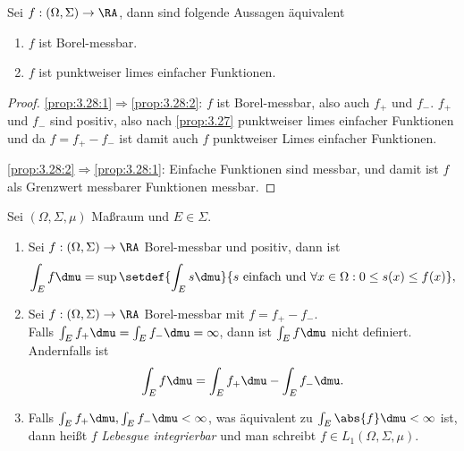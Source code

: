 \begin{cor}
\label{prop:3.28}
Sei $f: (\Omega,\Sigma)\to\RA$, dann sind folgende Aussagen äquivalent
\begin{enumerate}[label=(\roman{*})]
  \item\label{prop:3.28:1} $f$ ist Borel-messbar.
  \item\label{prop:3.28:2} $f$ ist punktweiser limes einfacher
  Funktionen.\fishhere
\end{enumerate}
\end{cor}
\begin{proof}
\ref{prop:3.28:1}$\Rightarrow$\ref{prop:3.28:2}: $f$ ist Borel-messbar, also
auch $f_+$ und $f_-$.  $f_+$ und $f_-$ sind positiv, also nach
\ref{prop:3.27} punktweiser limes einfacher Funktionen und  da $f = f_+ - f_-$
ist damit auch $f$ punktweiser Limes einfacher Funktionen.

\ref{prop:3.28:2}$\Rightarrow$\ref{prop:3.28:1}: Einfache Funktionen sind
messbar, und damit ist $f$ als Grenzwert messbarer Funktionen messbar.\qedhere
\end{proof}

\begin{defn}
\label{defn:3.29}
Sei $(\Omega,\Sigma,\mu)$ Maßraum und $E\in\Sigma$.
\begin{enumerate}[label=(\roman{*})]
  \item Sei $f:(\Omega,\Sigma)\to\RA$ Borel-messbar und positiv, dann ist
  \begin{align*}
  \int_E f\dmu = \sup\setdef{\int_E s \dmu}{s \text{ einfach und }\forall
  x\in\Omega : 0\le s(x)\le f(x)},
  \end{align*}
\item Sei $f:(\Omega,\Sigma)\to\RA$ Borel-messbar mit $f = f_+ - f_-$.\\
Falls $\int_E f_+\dmu = \int_E f_-\dmu = \infty$, dann ist $\int_E f \dmu$
nicht definiert. Andernfalls ist
\begin{align*}
\int_E f\dmu = \int_E f_+ \dmu - \int_E f_- \dmu.
\end{align*}
\item
Falls $\int_E f_+\dmu, \int_E f_- \dmu <\infty$, was äquivalent zu $\int_E
\abs{f} \dmu <\infty$ ist, dann heißt $f$ \emph{Lebesgue integrierbar} und man
schreibt $f\in L_1(\Omega,\Sigma,\mu)$.\fishhere
\end{enumerate}
\end{defn}


